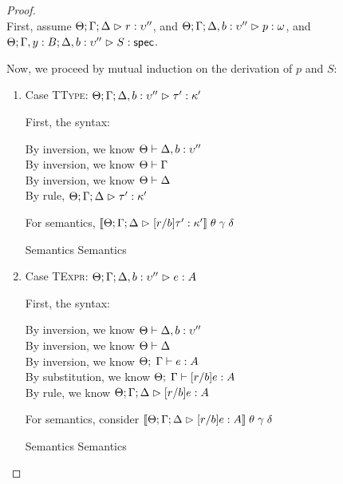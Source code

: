 \begin{proof}
\ \\

First, assume $\judgeA{r}{\upsilon''}$, and $\judgeA[\Theta; \Gamma;\Delta, b:\upsilon'']{p}{\omega}$, and
$\judgeS[\Theta; \Gamma, y:B; \Delta, b:\upsilon'']{S}$. 

Now, we proceed by mutual induction on the derivation of $p$ and $S$: 
\begin{enumerate}

\item Case \textsc{TType}: $\judgeA[\Theta; \Gamma; \Delta, b:\upsilon'']{\tau'}{\kappa'}$

  First, the syntax:
  \begin{tabbedproof}
    \oo By inversion, we know $\judgectx{\Theta}{\Delta, b:\upsilon''}$ \\
    \oo By inversion, we know $\judgectx{\Theta}{\Gamma}$ \\
    \oo By inversion, we know $\judgectx{\Theta}{\Delta}$ \\
    \oo By rule, $\judgeA[\Theta; \Gamma;\Delta]{\tau'}{\kappa'}$
  \end{tabbedproof}

  For semantics,  $\interp{\judgeA[\Theta; \Gamma; \Delta]{[r/b]\tau'}{\kappa'}}\;\theta\;\gamma\;\delta$
  \begin{eqnproof}
          {Semantics}
          {Semantics}
  \end{eqnproof}

  \item Case \textsc{TExpr}: $\judgeA[\Theta; \Gamma; \Delta, b:\upsilon'']{e}{A}$

    First, the syntax:
    \begin{tabbedproof}
      \oo By inversion, we know $\judgectx{\Theta}{\Delta, b:\upsilon''}$ \\
      \oo By inversion, we know $\judgectx{\Theta}{\Delta}$ \\
      \oo By inversion, we know $\judgeE{\Gamma}{e}{A}$ \\
      \oo By substitution, we know $\judgeE{\Gamma}{[r/b]e}{A}$ \\
      \oo By rule, we know $\judgeA[\Theta; \Gamma; \Delta]{[r/b]e}{A}$
    \end{tabbedproof}

    For semantics, consider $\interp{\judgeA[\Theta; \Gamma; \Delta]{[r/b]e}{A}}\;\theta\;\gamma\;\delta$
    \begin{eqnproof}
            {Semantics}
            {Semantics}
    \end{eqnproof}


\end{enumerate}
\end{proof}
